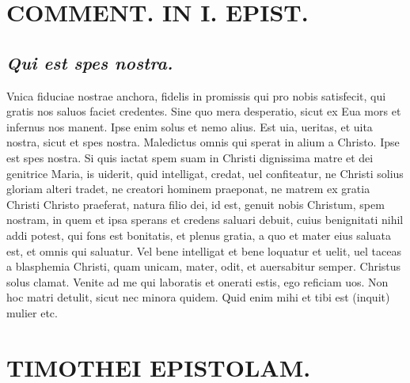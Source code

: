 \documentclass{article}
\begin{document}
\begin{pages}
\section*{COMMENT. IN I. EPIST. }
\marginpar{[ p.6 ]}
{}
\subsection*{\textit{Qui est spes nostra. }}\pstart Vnica fiduciae nostrae anchora, fidelis in promissis qui pro nobis satisfecit, qui gratis nos saluos faciet credentes. Sine quo mera desperatio, sicut ex Eua mors et infernus nos manent. Ipse enim solus et nemo alius. Est uia, ueritas, et uita nostra, sicut et spes nostra. Maledictus omnis qui sperat in alium a Christo. Ipse est spes nostra. Si quis iactat spem suam in Christi dignissima matre et dei genitrice Maria, is uiderit, quid intelligat, credat, uel confiteatur, ne Christi solius gloriam alteri tradet, ne creatori hominem praeponat, ne matrem ex gratia Christi Christo praeferat, natura filio dei, id est, genuit nobis Christum, spem nostram, in quem et ipsa sperans et credens saluari debuit, cuius benignitati nihil addi potest, qui fons est bonitatis, et plenus gratia, a quo et mater eius saluata est, et omnis qui saluatur. Vel bene intelligat et bene loquatur et uelit, uel taceas a blasphemia Christi, quam unicam, mater, odit, et auersabitur semper. Christus solus clamat. Venite ad me qui laboratis et onerati estis, ego reficiam uos. Non hoc matri detulit, sicut nec minora quidem. Quid enim mihi et tibi est (inquit) mulier etc.  \pend
\section*{TIMOTHEI EPISTOLAM. }
\marginpar{[ p.7 ]}
{}

\end{pages}
\end{document}
